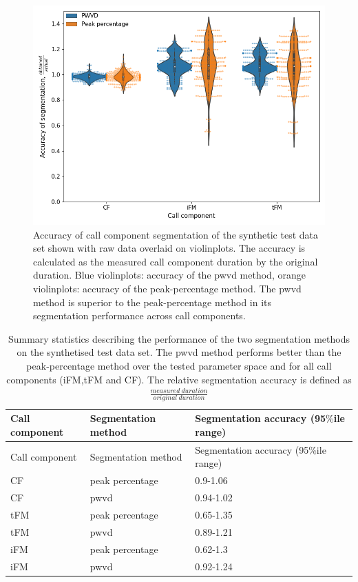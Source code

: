 \documentclass[
]{book}
\begin{document}
\begin{figure}
\includegraphics[width=1\linewidth]{original_papers/itsfm-paper/figures/pwvd-pkpct-comparison} \caption{\label{fig:performance} Accuracy of call component segmentation of the synthetic test data set shown with raw data overlaid on violinplots. The accuracy is calculated as the measured call component duration by the original duration. Blue violinplots: accuracy of the pwvd method, orange violinplots: accuracy of the peak-percentage method. The pwvd method is superior to the peak-percentage method in its segmentation performance across call components.}\label{fig:performance}
\end{figure}

\begin{longtable}[]{@{}lll@{}}
\caption{\label{tab:accuracypctiles} Summary statistics describing the performance of the two segmentation methods on the synthetised test data set. The pwvd method performs better than the peak-percentage method over the tested parameter space and for all call components (iFM,tFM and CF). The relative segmentation accuracy is defined as \(\frac{measured \:duration}{original \:duration}\)}\tabularnewline
\toprule
Call component & Segmentation method & Segmentation accuracy (95\(\%\)ile range)\tabularnewline
\midrule
\endfirsthead
\toprule
Call component & Segmentation method & Segmentation accuracy (95\(\%\)ile range)\tabularnewline
\midrule
\endhead
CF & peak percentage & 0.9-1.06\tabularnewline
CF & pwvd & 0.94-1.02\tabularnewline
tFM & peak percentage & 0.65-1.35\tabularnewline
tFM & pwvd & 0.89-1.21\tabularnewline
iFM & peak percentage & 0.62-1.3\tabularnewline
iFM & pwvd & 0.92-1.24\tabularnewline
\bottomrule
\end{longtable}
\end{document}
